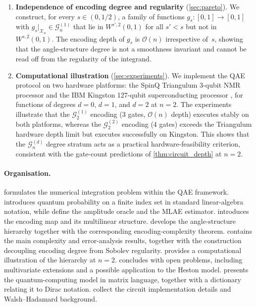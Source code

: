 \documentclass[12pt,a4paper]{article}
\theoremstyle{plain}
\theoremstyle{definition}
\theoremstyle{remark}
\newcommand{\Gclass}[2]{\mathcal{G}_{#1}^{(#2)}}
\begin{document}
\begin{enumerate}[label=(\roman*)]
\item
  \textbf{Independence of encoding degree and regularity}
  (\cref{sec:pareto}).
  We construct, for every $s\in(0,1/2)$, a family of functions
  $g_s:[0,1]\to[0,1]$ with $g_s|_{\mathcal{X}_n}\in\Gclass{n}{1}$ that
  lie in $W^{s',2}(0,1)$ for all $s'<s$ but not in $W^{s,2}(0,1)$.
  The encoding depth of $g_s$ is $\mathcal{O}(n)$ irrespective
  of~$s$, showing that the angle-structure degree is not a smoothness
  invariant and cannot be read off from the regularity of the
  integrand.

\item
  \textbf{Computational illustration} (\cref{sec:experiments}).
  We implement the QAE protocol on two hardware platforms: the SpinQ
  Triangulum 3-qubit NMR processor \cite{SpinQ2021} and the IBM Kingston
  127-qubit superconducting processor \cite{IBMQuantum2024}, for functions
  of degrees $d=0$, $d=1$, and $d=2$ at $n=2$.
  The experiments illustrate that the $\Gclass{2}{1}$ encoding
  (3 gates, $\mathcal{O}(n)$ depth) executes stably on both platforms,
  whereas the $\Gclass{2}{2}$ encoding (4 gates) exceeds the Triangulum
  hardware depth limit but executes successfully on Kingston.
  This shows that the $\Gclass{n}{d}$
  degree stratum acts as a practical hardware-feasibility criterion,
  consistent with the gate-count predictions of \cref{thm:circuit_depth}
  at $n=2$.
\end{enumerate}

\paragraph{Organisation.}
 formulates the numerical integration problem within
the QAE framework.
 introduces quantum probability on a finite index set
in standard linear-algebra notation, while
 define the amplitude oracle and the
MLAE estimator.
 introduces the encoding map and its multilinear
structure.
 develops the angle-structure hierarchy together
with the corresponding encoding-complexity theorem.
 contains the main complexity and error-analysis
results, together with the construction decoupling encoding degree
from Sobolev regularity.
 provides a computational illustration of the
hierarchy at $n=2$.
 concludes with open problems, including
multivariate extensions and a possible application to the Heston model.
 presents the quantum-computing model in matrix language,
together with a dictionary relating it to Dirac notation.
 collect the circuit implementation
details and Walsh--Hadamard background.
\end{document}
